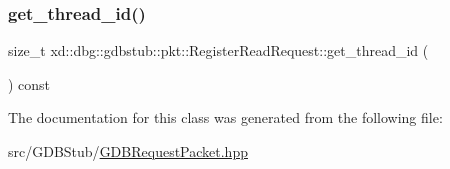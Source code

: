 \subsubsection{\texorpdfstring{get\+\_\+thread\+\_\+id()}{get\_thread\_id()}}
{\footnotesize\ttfamily size\+\_\+t xd\+::dbg\+::gdbstub\+::pkt\+::\+Register\+Read\+Request\+::get\+\_\+thread\+\_\+id (\begin{DoxyParamCaption}{ }\end{DoxyParamCaption}) const\hspace{0.3cm}{\ttfamily [inline]}}



The documentation for this class was generated from the following file\+:\begin{DoxyCompactItemize}
\item 
src/\+G\+D\+B\+Stub/\mbox{\hyperlink{_g_d_b_request_packet_8hpp}{G\+D\+B\+Request\+Packet.\+hpp}}\end{DoxyCompactItemize}
